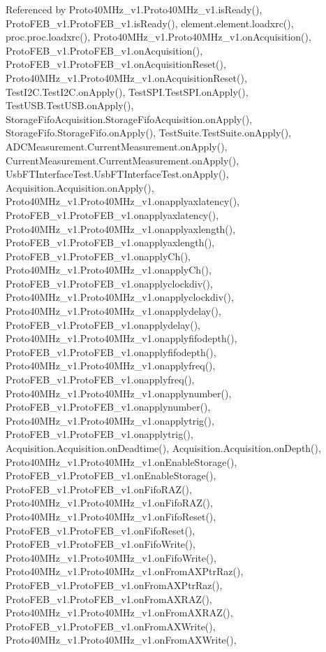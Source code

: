 Referenced by Proto40\+M\+Hz\+\_\+v1.\+Proto40\+M\+Hz\+\_\+v1.\+is\+Ready(), Proto\+F\+E\+B\+\_\+v1.\+Proto\+F\+E\+B\+\_\+v1.\+is\+Ready(), element.\+element.\+loadxrc(), proc.\+proc.\+loadxrc(), Proto40\+M\+Hz\+\_\+v1.\+Proto40\+M\+Hz\+\_\+v1.\+on\+Acquisition(), Proto\+F\+E\+B\+\_\+v1.\+Proto\+F\+E\+B\+\_\+v1.\+on\+Acquisition(), Proto\+F\+E\+B\+\_\+v1.\+Proto\+F\+E\+B\+\_\+v1.\+on\+Acquisition\+Reset(), Proto40\+M\+Hz\+\_\+v1.\+Proto40\+M\+Hz\+\_\+v1.\+on\+Acquisition\+Reset(), Test\+I2\+C.\+Test\+I2\+C.\+on\+Apply(), Test\+S\+P\+I.\+Test\+S\+P\+I.\+on\+Apply(), Test\+U\+S\+B.\+Test\+U\+S\+B.\+on\+Apply(), Storage\+Fifo\+Acquisition.\+Storage\+Fifo\+Acquisition.\+on\+Apply(), Storage\+Fifo.\+Storage\+Fifo.\+on\+Apply(), Test\+Suite.\+Test\+Suite.\+on\+Apply(), A\+D\+C\+Measurement.\+Current\+Measurement.\+on\+Apply(), Current\+Measurement.\+Current\+Measurement.\+on\+Apply(), Usb\+F\+T\+Interface\+Test.\+Usb\+F\+T\+Interface\+Test.\+on\+Apply(), Acquisition.\+Acquisition.\+on\+Apply(), Proto40\+M\+Hz\+\_\+v1.\+Proto40\+M\+Hz\+\_\+v1.\+onapplyaxlatency(), Proto\+F\+E\+B\+\_\+v1.\+Proto\+F\+E\+B\+\_\+v1.\+onapplyaxlatency(), Proto40\+M\+Hz\+\_\+v1.\+Proto40\+M\+Hz\+\_\+v1.\+onapplyaxlength(), Proto\+F\+E\+B\+\_\+v1.\+Proto\+F\+E\+B\+\_\+v1.\+onapplyaxlength(), Proto\+F\+E\+B\+\_\+v1.\+Proto\+F\+E\+B\+\_\+v1.\+onapply\+Ch(), Proto40\+M\+Hz\+\_\+v1.\+Proto40\+M\+Hz\+\_\+v1.\+onapply\+Ch(), Proto\+F\+E\+B\+\_\+v1.\+Proto\+F\+E\+B\+\_\+v1.\+onapplyclockdiv(), Proto40\+M\+Hz\+\_\+v1.\+Proto40\+M\+Hz\+\_\+v1.\+onapplyclockdiv(), Proto40\+M\+Hz\+\_\+v1.\+Proto40\+M\+Hz\+\_\+v1.\+onapplydelay(), Proto\+F\+E\+B\+\_\+v1.\+Proto\+F\+E\+B\+\_\+v1.\+onapplydelay(), Proto40\+M\+Hz\+\_\+v1.\+Proto40\+M\+Hz\+\_\+v1.\+onapplyfifodepth(), Proto\+F\+E\+B\+\_\+v1.\+Proto\+F\+E\+B\+\_\+v1.\+onapplyfifodepth(), Proto40\+M\+Hz\+\_\+v1.\+Proto40\+M\+Hz\+\_\+v1.\+onapplyfreq(), Proto\+F\+E\+B\+\_\+v1.\+Proto\+F\+E\+B\+\_\+v1.\+onapplyfreq(), Proto40\+M\+Hz\+\_\+v1.\+Proto40\+M\+Hz\+\_\+v1.\+onapplynumber(), Proto\+F\+E\+B\+\_\+v1.\+Proto\+F\+E\+B\+\_\+v1.\+onapplynumber(), Proto40\+M\+Hz\+\_\+v1.\+Proto40\+M\+Hz\+\_\+v1.\+onapplytrig(), Proto\+F\+E\+B\+\_\+v1.\+Proto\+F\+E\+B\+\_\+v1.\+onapplytrig(), Acquisition.\+Acquisition.\+on\+Deadtime(), Acquisition.\+Acquisition.\+on\+Depth(), Proto40\+M\+Hz\+\_\+v1.\+Proto40\+M\+Hz\+\_\+v1.\+on\+Enable\+Storage(), Proto\+F\+E\+B\+\_\+v1.\+Proto\+F\+E\+B\+\_\+v1.\+on\+Enable\+Storage(), Proto\+F\+E\+B\+\_\+v1.\+Proto\+F\+E\+B\+\_\+v1.\+on\+Fifo\+R\+A\+Z(), Proto40\+M\+Hz\+\_\+v1.\+Proto40\+M\+Hz\+\_\+v1.\+on\+Fifo\+R\+A\+Z(), Proto40\+M\+Hz\+\_\+v1.\+Proto40\+M\+Hz\+\_\+v1.\+on\+Fifo\+Reset(), Proto\+F\+E\+B\+\_\+v1.\+Proto\+F\+E\+B\+\_\+v1.\+on\+Fifo\+Reset(), Proto\+F\+E\+B\+\_\+v1.\+Proto\+F\+E\+B\+\_\+v1.\+on\+Fifo\+Write(), Proto40\+M\+Hz\+\_\+v1.\+Proto40\+M\+Hz\+\_\+v1.\+on\+Fifo\+Write(), Proto40\+M\+Hz\+\_\+v1.\+Proto40\+M\+Hz\+\_\+v1.\+on\+From\+A\+X\+Ptr\+Raz(), Proto\+F\+E\+B\+\_\+v1.\+Proto\+F\+E\+B\+\_\+v1.\+on\+From\+A\+X\+Ptr\+Raz(), Proto\+F\+E\+B\+\_\+v1.\+Proto\+F\+E\+B\+\_\+v1.\+on\+From\+A\+X\+R\+A\+Z(), Proto40\+M\+Hz\+\_\+v1.\+Proto40\+M\+Hz\+\_\+v1.\+on\+From\+A\+X\+R\+A\+Z(), Proto\+F\+E\+B\+\_\+v1.\+Proto\+F\+E\+B\+\_\+v1.\+on\+From\+A\+X\+Write(), Proto40\+M\+Hz\+\_\+v1.\+Proto40\+M\+Hz\+\_\+v1.\+on\+From\+A\+X\+Write(), 